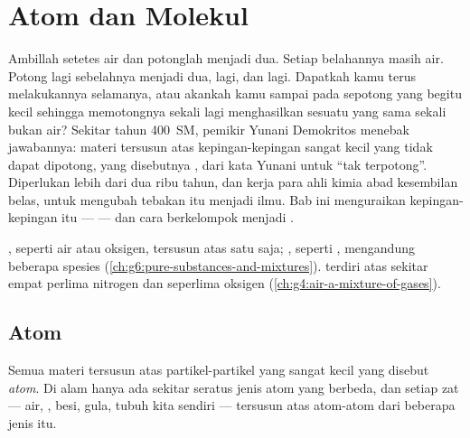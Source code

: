\chapter{Atom dan Molekul}\label{ch:g7:atoms-and-molecules}

Ambillah setetes air dan potonglah menjadi dua. Setiap belahannya masih
air. Potong lagi sebelahnya menjadi dua, lagi, dan lagi. Dapatkah kamu
terus melakukannya selamanya, atau akankah kamu sampai pada sepotong
yang begitu kecil sehingga memotongnya sekali lagi menghasilkan sesuatu
yang sama sekali bukan air? Sekitar tahun 400~SM, pemikir Yunani
Demokritos menebak jawabannya: materi tersusun atas kepingan-kepingan
sangat kecil yang tidak dapat dipotong, yang disebutnya \emph{},
dari kata Yunani untuk ``tak terpotong''. Diperlukan lebih dari dua ribu
tahun, dan kerja para ahli kimia abad kesembilan belas, untuk mengubah
tebakan itu menjadi ilmu. Bab ini menguraikan kepingan-kepingan itu ---
 --- dan cara  berkelompok menjadi .

\begin{recall}
, seperti air atau oksigen, tersusun atas satu 
saja; , seperti , mengandung beberapa spesies
(\cref{ch:g6:pure-substances-and-mixtures}).  terdiri atas
sekitar empat perlima nitrogen dan seperlima oksigen
(\cref{ch:g4:air-a-mixture-of-gases}).
\end{recall}

\section{Atom}

\begin{definition}[Atom]\label{def:g7:atoms-and-molecules:atom}
Semua materi tersusun atas partikel-partikel yang sangat kecil yang
disebut \emph{atom}. Di alam hanya ada sekitar seratus
jenis atom yang berbeda, dan setiap zat --- air, , besi, gula,
tubuh kita sendiri --- tersusun atas atom-atom dari beberapa jenis itu.
\end{definition}


